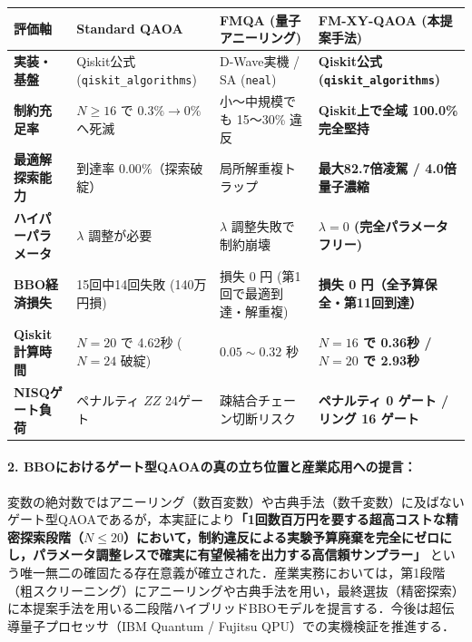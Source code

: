 \documentclass[11pt,a4paper]{ltjsarticle}
\begin{document}
\vspace{-1mm}
\begin{center}
\label{tab:final_summary}
\vspace{1mm}
\footnotesize
\begin{tabularx}{\textwidth}{l >{\raggedright\arraybackslash}p{3.8cm} >{\raggedright\arraybackslash}p{3.8cm} >{\raggedright\arraybackslash}X}
\toprule
\textbf{評価軸} & \textbf{Standard QAOA} & \textbf{FMQA (量子アニーリング)} & \textbf{FM-XY-QAOA (本提案手法)} \\
\midrule
\textbf{実装・基盤} & Qiskit公式 (\texttt{qiskit\_algorithms}) & D-Wave実機 / SA (\texttt{neal}) & \textbf{Qiskit公式 (\texttt{qiskit\_algorithms})} \\
\textbf{制約充足率} & $N \ge 16$ で $0.3\% \to 0\%$ へ死滅 & 小〜中規模でも 15〜30\% 違反 & \textbf{Qiskit上で全域 100.0\% 完全堅持} \\
\textbf{最適解探索能力} & 到達率 $0.00\%$（探索破綻） & 局所解重複トラップ & \textbf{最大82.7倍凌駕 / 4.0倍量子濃縮} \\
\textbf{ハイパーパラメータ} & $\lambda$ 調整が必要 & $\lambda$ 調整失敗で制約崩壊 & \textbf{$\lambda=0$ (完全パラメータフリー)} \\
\textbf{BBO経済損失} & 15回中14回失敗 (140万円損) & 損失 0 円 (第1回で最適到達・解重複) & \textbf{損失 0 円（全予算保全・第11回到達）} \\
\textbf{Qiskit計算時間} & $N=20$ で 4.62秒 ($N=24$ 破綻) & $0.05 \sim 0.32$ 秒 & \textbf{$N=16$ で 0.36秒 / $N=20$ で 2.93秒} \\
\textbf{NISQゲート負荷} & ペナルティ $ZZ$ 24ゲート & 疎結合チェーン切断リスク & \textbf{ペナルティ 0 ゲート / リング 16 ゲート} \\
\bottomrule
\end{tabularx}
\end{center}

\vspace{-2mm}
\paragraph{2. BBOにおけるゲート型QAOAの真の立ち位置と産業応用への提言：}
変数の絶対数ではアニーリング（数百変数）や古典手法（数千変数）に及ばないゲート型QAOAであるが，本実証により\textbf{「1回数百万円を要する超高コストな精密探索段階（$N \le 20$）において，制約違反による実験予算廃棄を完全にゼロにし，パラメータ調整レスで確実に有望候補を出力する高信頼サンプラー」} という唯一無二の確固たる存在意義が確立された．産業実務においては，第1段階（粗スクリーニング）にアニーリングや古典手法を用い，最終選抜（精密探索）に本提案手法を用いる二段階ハイブリッドBBOモデルを提言する．今後は超伝導量子プロセッサ（IBM Quantum / Fujitsu QPU）での実機検証を推進する．
\end{document}

